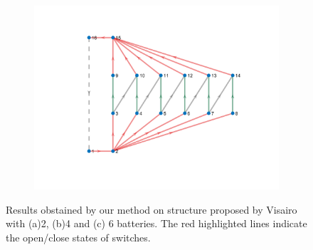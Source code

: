\documentclass{article}
\begin{document}
\begin{figure}[htbp]
\begin{subfigure}[b]{0.3\textwidth}
        \caption{}
        \label{fig:d-size-4}
    \end{subfigure}
    \hspace{0.05\textwidth}
    \begin{subfigure}[b]{0.45\textwidth}
        \includegraphics[width=\textwidth]{../attachments/f-dege-mac-6.png}
        \caption{}
        \label{fig:d-size-6}
    \end{subfigure}

    \caption{Results obstained by our method on structure proposed by Visairo\cite{visairoReconfigurableBatteryPack2008} with (a)2, (b)4 and (c) 6 batteries.  The red highlighted lines indicate the open/close states of switches.}
    \label{fig:d-size}
\end{figure}
\end{document}
